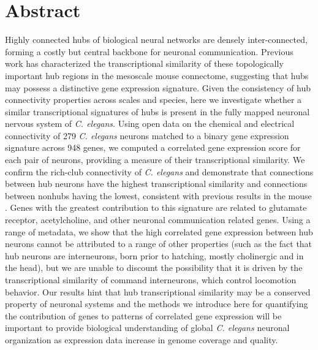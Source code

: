 \documentclass[10pt,letterpaper]{article}
\begin{document}
\section*{Abstract}
Highly connected hubs of biological neural networks are densely inter-connected, forming a costly but central backbone for neuronal communication.
Previous work has characterized the transcriptional similarity of these topologically important hub regions in the mesoscale mouse connectome, suggesting that hubs may possess a distinctive gene expression signature.
Given the consistency of hub connectivity properties across scales and species, here we investigate whether a similar transcriptional signatures of hubs is present in the fully mapped neuronal nervous system of \emph{C. elegans}.
Using open data on the chemical and electrical connectivity of 279 \emph{C. elegans} neurons matched to a binary gene expression signature across 948 genes, we computed a correlated gene expression score for each pair of neurons, providing a measure of their transcriptional similarity.
We confirm the rich-club connectivity of \emph{C. elegans} and demonstrate that connections between hub neurons have the highest transcriptional similarity and connections between nonhubs having the lowest, consistent with previous results in the mouse \cite{Fulcher:2016ck}.
Genes with the greatest contribution to this signature are related to glutamate receptor, acetylcholine, and other neuronal communication related genes.
Using a range of metadata, we show that the high correlated gene expression between hub neurons cannot be attributed to a range of other properties (such as the fact that hub neurons are interneurons, born prior to hatching, mostly cholinergic and in the head), but we are unable to discount the possibility that it is driven by the transcriptional similarity of command interneurons, which control locomotion behavior.
Our results hint that hub transcriptional similarity may be a conserved property of neuronal systems and the methods we introduce here for quantifying the contribution of genes to patterns of correlated gene expression will be important to provide biological understanding of global \emph{C. elegans} neuronal organization as expression data increase in genome coverage and quality.

\end{document}
